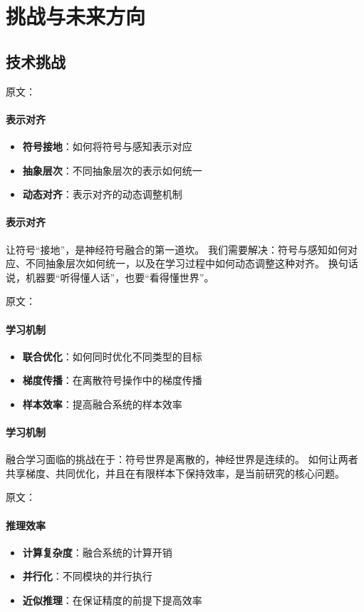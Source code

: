 \section{挑战与未来方向}

\subsection{技术挑战}

原文：
\paragraph{表示对齐}
\begin{itemize}
\item \textbf{符号接地}：如何将符号与感知表示对应
\item \textbf{抽象层次}：不同抽象层次的表示如何统一
\item \textbf{动态对齐}：表示对齐的动态调整机制
\end{itemize}
\paragraph{表示对齐}
让符号“接地”，是神经符号融合的第一道坎。  
我们需要解决：符号与感知如何对应、不同抽象层次如何统一，以及在学习过程中如何动态调整这种对齐。  
换句话说，机器要“听得懂人话”，也要“看得懂世界”。

原文：
\paragraph{学习机制}
\begin{itemize}
\item \textbf{联合优化}：如何同时优化不同类型的目标
\item \textbf{梯度传播}：在离散符号操作中的梯度传播
\item \textbf{样本效率}：提高融合系统的样本效率
\end{itemize}
\paragraph{学习机制}
融合学习面临的挑战在于：符号世界是离散的，神经世界是连续的。  
如何让两者共享梯度、共同优化，并且在有限样本下保持效率，是当前研究的核心问题。

原文：
\paragraph{推理效率}
\begin{itemize}
\item \textbf{计算复杂度}：融合系统的计算开销
\item \textbf{并行化}：不同模块的并行执行
\item \textbf{近似推理}：在保证精度的前提下提高效率
\end{itemize}
